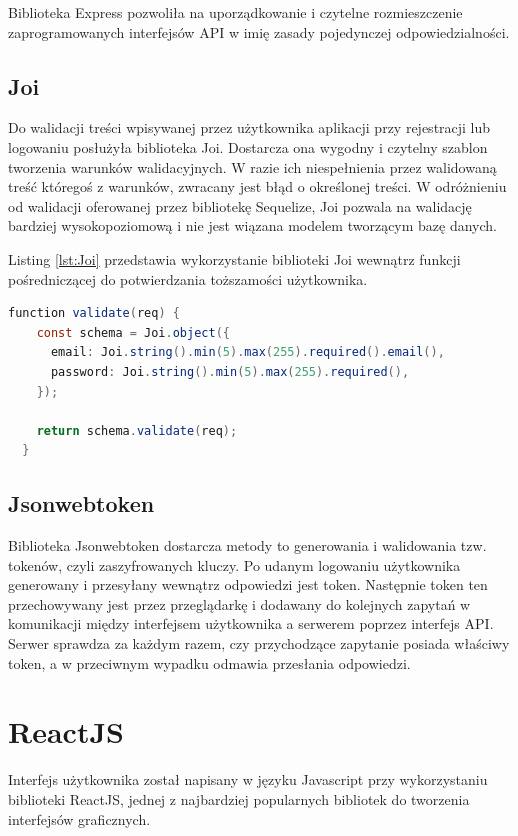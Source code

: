 \documentclass{sprz}
\begin{document}
Biblioteka Express pozwoliła na uporządkowanie i czytelne rozmieszczenie zaprogramowanych interfejsów API w imię zasady pojedynczej odpowiedzialności.

\subsection{Joi}

Do walidacji treści wpisywanej przez użytkownika aplikacji przy rejestracji lub logowaniu posłużyła biblioteka Joi. Dostarcza ona wygodny i czytelny szablon tworzenia warunków walidacyjnych. W razie ich niespełnienia przez walidowaną treść któregoś z warunków, zwracany jest błąd o określonej treści. W odróżnieniu od walidacji oferowanej przez bibliotekę Sequelize, Joi pozwala na walidację bardziej wysokopoziomową i nie jest wiązana modelem tworzącym bazę danych.

Listing \ref{lst:Joi} przedstawia wykorzystanie biblioteki Joi wewnątrz funkcji pośredniczącej do potwierdzania toższamości użytkownika.

\begin{lstlisting}[language=Java,caption={Przykład wykorzystania Joi}, label={lst:Joi}]
  function validate(req) {
    const schema = Joi.object({
      email: Joi.string().min(5).max(255).required().email(),
      password: Joi.string().min(5).max(255).required(),
    });
  
    return schema.validate(req);
  }
\end{lstlisting}

\subsection{Jsonwebtoken}

Biblioteka Jsonwebtoken dostarcza metody to generowania i walidowania tzw. tokenów, czyli zaszyfrowanych kluczy. Po udanym logowaniu użytkownika generowany i przesyłany wewnątrz odpowiedzi jest token. Następnie token ten przechowywany jest przez przeglądarkę i dodawany do kolejnych zapytań w komunikacji między interfejsem użytkownika a serwerem poprzez interfejs API. Serwer sprawdza za każdym razem, czy przychodzące zapytanie posiada właściwy token, a w przeciwnym wypadku odmawia przesłania odpowiedzi.

\section{ReactJS}

Interfejs użytkownika został napisany w języku Javascript przy wykorzystaniu biblioteki ReactJS, jednej z najbardziej popularnych bibliotek do tworzenia interfejsów graficznych.
\end{document}
